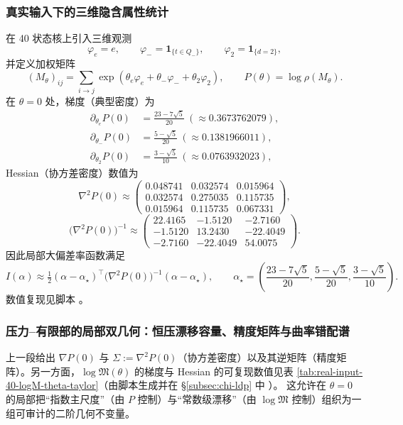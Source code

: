 \subsubsection{真实输入下的三维隐含属性统计}\label{app:real-input-40-arity-3d}
在 40 状态核上引入三维观测
\[
\varphi_e=e,\qquad
\varphi_-=\mathbf{1}_{\{t\in Q_-\}},\qquad
\varphi_2=\mathbf{1}_{\{d=2\}},
\]
并定义加权矩阵
\[
(M_\theta)_{ij}=\sum_{i\to j}\exp(\theta_e\varphi_e+\theta_-\varphi_-+\theta_2\varphi_2),
\qquad
P(\theta)=\log\rho(M_\theta).
\]
在 $\theta=0$ 处，梯度（典型密度）为
\[
\begin{aligned}
\partial_{\theta_e}P(0)&=\frac{23-7\sqrt5}{20}\ (\approx 0.3673762079),\\
\partial_{\theta_-}P(0)&=\frac{5-\sqrt5}{20}\ (\approx 0.1381966011),\\
\partial_{\theta_2}P(0)&=\frac{3-\sqrt5}{10}\ (\approx 0.0763932023),
\end{aligned}
\]
Hessian（协方差密度）数值为
\[
\nabla^2P(0)\approx
\begin{pmatrix}
0.048741 & 0.032574 & 0.015964\\
0.032574 & 0.275035 & 0.115735\\
0.015964 & 0.115735 & 0.067331
\end{pmatrix},
\]
\[
\bigl(\nabla^2P(0)\bigr)^{-1}\approx
\begin{pmatrix}
22.4165 & -1.5120 & -2.7160\\
-1.5120 & 13.2430 & -22.4049\\
-2.7160 & -22.4049 & 54.0075
\end{pmatrix}.
\]
因此局部大偏差率函数满足
\[
I(\alpha)\approx \tfrac12(\alpha-\alpha_\star)^\top\bigl(\nabla^2P(0)\bigr)^{-1}(\alpha-\alpha_\star),
\qquad
\alpha_\star=\left(\frac{23-7\sqrt5}{20},\frac{5-\sqrt5}{20},\frac{3-\sqrt5}{10}\right).
\]
数值复现见脚本 。

\subsubsection{压力--有限部的局部双几何：恒压漂移容量、精度矩阵与曲率错配谱}\label{app:real-input-40-local-bigeometry}
上一段给出 \(\nabla P(0)\) 与 \(\Sigma:=\nabla^2P(0)\)（协方差密度）以及其逆矩阵（精度矩阵）。另一方面，\(\log\mathfrak{M}(\theta)\) 的梯度与 Hessian 的可复现数值见表 \ref{tab:real-input-40-logM-theta-taylor}（由脚本生成并在 \S\ref{subsec:chi-ldp} 中 \verb||）。
这允许在 \(\theta=0\) 的局部把“指数主尺度”（由 \(P\) 控制）与“常数级漂移”（由 \(\log\mathfrak{M}\) 控制）组织为一组可审计的二阶几何不变量。

